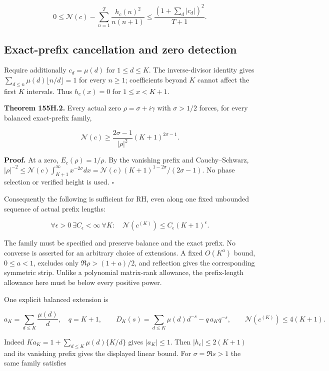 \documentclass[
  11pt,
]{book}
\begin{document}
\[
0\le\mathscr N(c)-\sum_{n=1}^T\frac{h_c(n)^2}{n(n+1)}
\le\frac{(1+\sum_d|c_d|)^2}{T+1}.
\tag{155H.4}
\]

\subsection{Exact-prefix cancellation and zero
detection}\label{exact-prefix-cancellation-and-zero-detection}

Require additionally \(c_d=\mu(d)\) for \(1\le d\le K\). The
inverse-divisor identity gives
\(\sum_{d\le n}\mu(d)\lfloor n/d\rfloor=1\) for every \(n\ge1\);
coefficients beyond \(K\) cannot affect the first \(K\) intervals. Thus
\(h_c(x)=0\) for \(1\le x<K+1\).

\textbf{Theorem 155H.2.} Every actual zero \(\rho=\sigma+i\gamma\) with
\(\sigma>1/2\) forces, for every balanced exact-prefix family,

\[
\boxed{\mathscr N(c)\ge
\frac{2\sigma-1}{|\rho|^2}(K+1)^{2\sigma-1}.}
\tag{155H.5}
\]

\textbf{Proof.} At a zero, \(E_c(\rho)=1/\rho\). By the vanishing prefix
and Cauchy--Schwarz,
\(|\rho|^{-2}\le\mathscr N(c)\int_{K+1}^\infty x^{-2\sigma}dx
=\mathscr N(c)(K+1)^{1-2\sigma}/(2\sigma-1)\). No phase selection or
verified height is used. \(\square\)

Consequently the following is sufficient for RH, even along one fixed
unbounded sequence of actual prefix lengths:

\[
\boxed{\forall\epsilon>0\ \exists C_\epsilon<\infty\ \forall K:
\quad\mathscr N(c^{(K)})\le C_\epsilon(K+1)^\epsilon.}
\tag{155H.6}
\]

The family must be specified and preserve balance and the exact prefix.
No converse is asserted for an arbitrary choice of extensions. A fixed
\(O(K^a)\) bound, \(0\le a<1\), excludes only \(\Re\rho>(1+a)/2\), and
reflection gives the corresponding symmetric strip. Unlike a polynomial
matrix-rank allowance, the prefix-length allowance here must be below
every positive power.

One explicit balanced extension is

\[
 a_K=\sum_{d\le K}\frac{\mu(d)}d,\quad q=K+1,\qquad
 D_K(s)=\sum_{d\le K}\mu(d)d^{-s}-q\,a_Kq^{-s},\qquad
 \mathscr N(c^{(K)})\le4(K+1).
\tag{155H.7}
\]

Indeed \(Ka_K=1+\sum_{d\le K}\mu(d)\{K/d\}\) gives \(|a_K|\le1\). Then
\(|h_c|\le2(K+1)\) and its vanishing prefix gives the displayed linear
bound. For \(\sigma=\Re s>1\) the same family satisfies
\end{document}
